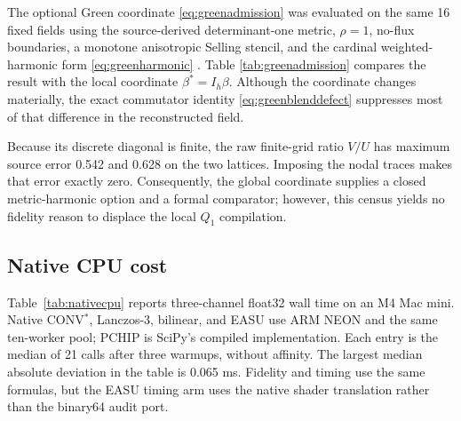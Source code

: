 The optional Green coordinate \eqref{eq:greenadmission} was evaluated on the
same 16 fixed fields using the source-derived determinant-one metric,
\(\rho=1\), no-flux boundaries, a monotone anisotropic Selling stencil, and
the cardinal weighted-harmonic form \eqref{eq:greenharmonic}
\cite{mirebeau2014}. Table
\ref{tab:greenadmission} compares the result with the local coordinate
\(\beta^*=I_h\beta\). Although the coordinate changes materially, the exact
commutator identity \eqref{eq:greenblenddefect} suppresses most of that
difference in the reconstructed field.

\begin{table}[H]
\caption{Cardinal Green admission versus local \(Q_1\) compilation}
\label{tab:greenadmission}
\centering
\scriptsize
\setlength{\tabcolsep}{2.2pt}
\end{table}

Because its discrete diagonal is finite, the raw finite-grid ratio \(V/U\)
has maximum source error 0.542 and 0.628 on the two lattices. Imposing the
nodal traces makes that error exactly zero. Consequently, the global
coordinate supplies a closed metric-harmonic option and a formal comparator;
however, this census yields no fidelity reason to displace the local \(Q_1\)
compilation.

\subsection{Native CPU cost}

Table~\ref{tab:nativecpu} reports three-channel float32 wall time on an M4
Mac mini. Native CONV$^{*}$, Lanczos-3, bilinear, and EASU use ARM
NEON and the same ten-worker pool; PCHIP is SciPy's compiled implementation.
Each entry is the median of 21 calls after three warmups, without affinity.
The largest median absolute deviation in the table is 0.065 ms. Fidelity and
timing use the same formulas, but the EASU timing arm uses the native shader
translation rather than the binary64 audit port.

